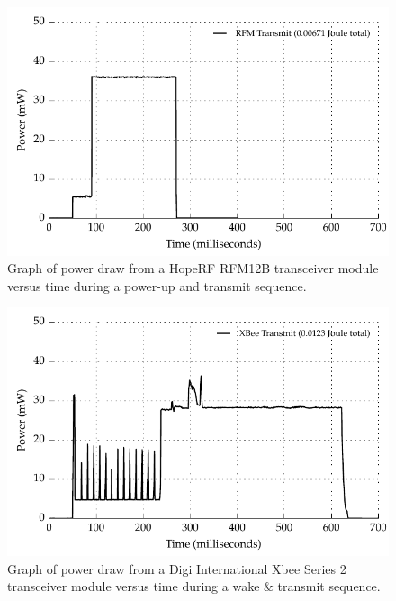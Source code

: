     \begin{figure}
      \centering
      \includegraphics{content/pt1/03-EnergyRequirements/graphics/Graph_RFMPower.pdf}
      \caption{\label{fig:Energy-consumed-RFM12B}Graph of power draw from a HopeRF RFM12B transceiver module versus time during a power-up and transmit sequence.}
    \end{figure}

    \begin{figure}
      \centering
      \includegraphics{content/pt1/03-EnergyRequirements/graphics/Graph_XbeePower.pdf}
      \caption{\label{fig:Energy-consumed-XBee}Graph of power draw from a Digi International Xbee Series 2 transceiver module versus time during a wake \& transmit sequence.}
    \end{figure}


